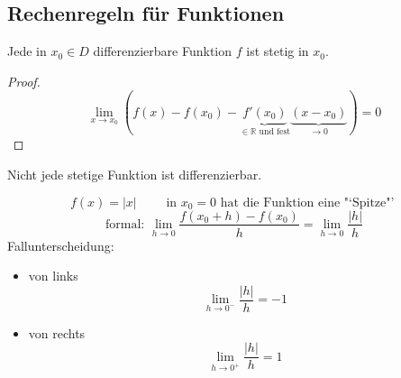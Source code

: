 \subsection{Rechenregeln für Funktionen}
\label{sec:rechenregeln_f_funktionen}

\begin{theorem}
  Jede in \( x_0 \in D \) differenzierbare Funktion \( f \) ist stetig in \( x_0\).
\end{theorem}
\begin{proof}
  \[ \lim_{x \rightarrow x_0} (f(x)-f(x_0)-\underbrace{f'(x_0)}_{\in \mathbb{R} \text{ und fest} }\underbrace{(x-x_0)}_{\longrightarrow 0}) = 0 \]
\end{proof}

\begin{theorem}
  Nicht jede stetige Funktion ist differenzierbar.
\end{theorem}

\begin{example}
\[	f(x)=|x| \qquad \text{ in } x_0=0 \text{ hat die Funktion eine "`Spitze"' } \]
\[	\text{formal: } \lim_{h \rightarrow 0}\frac{f(x_0+h)-f(x_0)}{h} = \lim_{h \rightarrow 0}\frac{|h|}{h}  \]
  Fallunterscheidung:
  \begin{itemize}
    \item von links \[\displaystyle\lim_{h \rightarrow 0^-}\frac{|h|}{h} = -1\]
    \item von rechts \[\displaystyle\lim_{h \rightarrow 0^+}\frac{|h|}{h} = 1\]
  \end{itemize}

\end{example}

\begin{center}
  \label{fig:Betragsfunktion}
\end{center}

